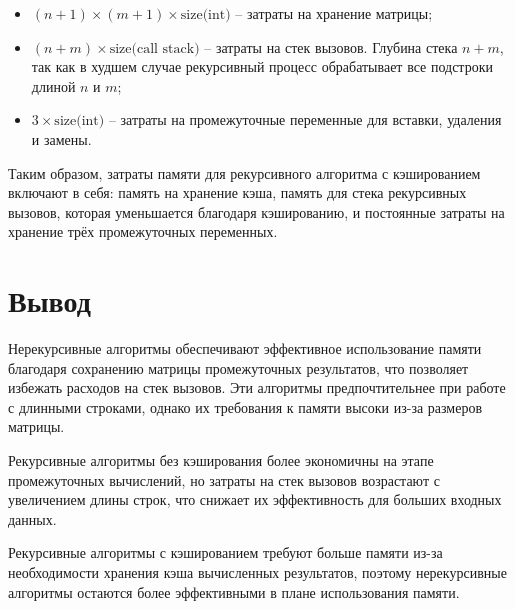 \documentclass[a4paper, 12pt]{extreport}
\begin{document}
\begin{itemize}
    \item[--] \((n+1) \times (m+1) \times \text{size(int)}\) -- затраты на хранение матрицы;
    
    \item[--] \((n + m) \times \text{size(call stack)}\) -- затраты на стек вызовов. Глубина стека \(n + m\), так как в худшем случае рекурсивный процесс обрабатывает все подстроки длиной \(n\) и \(m\);
    
    \item[--] \(3 \times \text{size(int)}\) -- затраты на промежуточные переменные для вставки, удаления и замены.
\end{itemize}

Таким образом, затраты памяти для рекурсивного алгоритма с кэшированием включают в себя: память на хранение кэша, память для стека рекурсивных вызовов, которая уменьшается благодаря кэшированию, и постоянные затраты на хранение трёх промежуточных переменных.

\section*{Вывод}
Нерекурсивные алгоритмы обеспечивают эффективное использование памяти благодаря сохранению матрицы промежуточных результатов, что позволяет избежать расходов на стек вызовов. Эти алгоритмы предпочтительнее при работе с длинными строками, однако их требования к памяти высоки из-за размеров матрицы.

Рекурсивные алгоритмы без кэширования более экономичны на этапе промежуточных вычислений, но затраты на стек вызовов возрастают с увеличением длины строк, что снижает их эффективность для больших входных данных.

Рекурсивные алгоритмы с кэшированием требуют больше памяти из-за необходимости хранения кэша вычисленных результатов, поэтому нерекурсивные алгоритмы остаются более эффективными в плане использования памяти.
\end{document}
